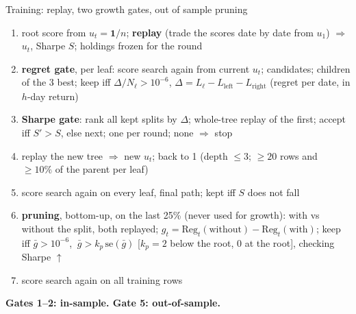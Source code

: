 \documentclass[10pt,aspectratio=169]{beamer}
\newcommand{\1}{\mathbf{1}}
\newcommand{\Reg}{\mathrm{Reg}}
\begin{document}
\begin{frame}{Training: replay, two growth gates, out of sample pruning}
\begin{center}
\end{center}
\footnotesize
\begin{enumerate}
\item[0.] root score from $u_t=\1/n$; \textbf{replay} (trade the scores date by date from $u_1$) $\Rightarrow$ $u_t$, Sharpe $S$; holdings frozen for the round
\item[1.] \textbf{regret gate}, per leaf: score search again from current $u_t$; candidates; children of the 3 best; keep iff $\Delta/N_\ell>10^{-6}$, $\Delta=L_\ell-L_{\mathrm{left}}-L_{\mathrm{right}}$ (regret per date, in $h$-day return)
\item[2.] \textbf{Sharpe gate}: rank all kept splits by $\Delta$; whole-tree replay of the first; accept iff $S'>S$, else next; one per round; none $\Rightarrow$ stop
\item[3.] replay the new tree $\Rightarrow$ new $u_t$; back to 1 (depth $\le3$; $\ge20$ rows and $\ge10\%$ of the parent per leaf)
\item[4.] score search again on every leaf, final path; kept iff $S$ does not fall
\item[5.] \textbf{pruning}, bottom-up, on the last 25\% (never used for growth): with vs without the split, both replayed;
$g_t=\Reg_t(\text{without})-\Reg_t(\text{with})$; keep iff $\bar g>10^{-6}$, $\ \bar g>k_p\,\mathrm{se}(\bar g)$ [$k_p=2$ below the root, $0$ at the root], checking Sharpe $\uparrow$
\item[6.] score search again on all training rows
\end{enumerate}
\textbf{Gates 1--2: in-sample. Gate 5: out-of-sample.}
\end{frame}
\end{document}
